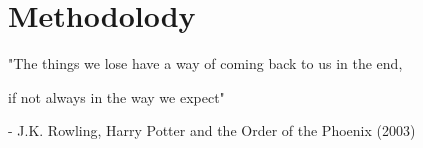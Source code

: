 
\chapter{Methodolody}
\label{chapter:methodolody}

\begin{introduction}
"The things we lose have a way of coming back to us in the end,

if not always in the way we expect"

- J.K. Rowling, Harry Potter and the Order of the Phoenix (2003)
\end{introduction}
